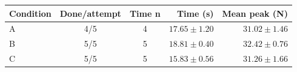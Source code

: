 \begin{tabular}{lccrr}
\toprule
Condition & Done/attempt & Time n & Time (s) & Mean peak (N) \\
\midrule
A & 4/5 & 4 & $17.65 \pm 1.20$ & $31.02 \pm 1.46$ \\
B & 5/5 & 5 & $18.81 \pm 0.40$ & $32.42 \pm 0.76$ \\
C & 5/5 & 5 & $15.83 \pm 0.56$ & $31.26 \pm 1.66$ \\
\bottomrule
\end{tabular}
